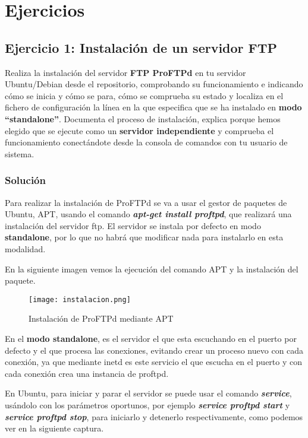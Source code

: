 \section{Ejercicios}

\subsection{Ejercicio 1: Instalación de un servidor FTP}
Realiza la instalación del servidor \textbf{FTP ProFTPd} en tu servidor Ubuntu/Debian desde el repositorio, comprobando su funcionamiento e indicando cómo se inicia y cómo se para, cómo se comprueba su estado y localiza en el fichero de configuración la línea en la que especifica que se ha instalado en \textbf{modo ``standalone''}. Documenta el proceso de instalación, explica porque hemos elegido que se ejecute como un \textbf{servidor independiente} y comprueba el funcionamiento conectándote desde la consola de comandos con tu usuario de sistema.

\subsubsection{Solución}
Para realizar la instalación de ProFTPd se va a usar el gestor de paquetes de Ubuntu, APT, usando el comando \textbf{\textit{apt-get install proftpd}}, que realizará una instalación del servidor ftp. El servidor se instala por defecto en modo \textbf{standalone}, por lo que no habrá que modificar nada para instalarlo en esta modalidad.

En la siguiente imagen vemos la ejecución del comando APT y la instalación del paquete.

\begin{figure}[H]
    \centering
    \texttt{[image: instalacion.png]}
    \caption{Instalación de ProFTPd mediante APT}
\end{figure}

En el \textbf{modo standalone}, es el servidor el que esta escuchando en el puerto por defecto y el que procesa las conexiones, evitando crear un proceso nuevo con cada conexión, ya que mediante inetd es este servicio el que escucha en el puerto y con cada conexión crea una instancia de proftpd.

En Ubuntu, para iniciar y parar el servidor se puede usar el comando \textbf{\textit{service}}, usándolo con los parámetros oportunos, por ejemplo \textbf{\textit{service proftpd start}} y \textbf{\textit{service proftpd stop}}, para iniciarlo y detenerlo respectivamente, como podemos ver en la siguiente captura.

